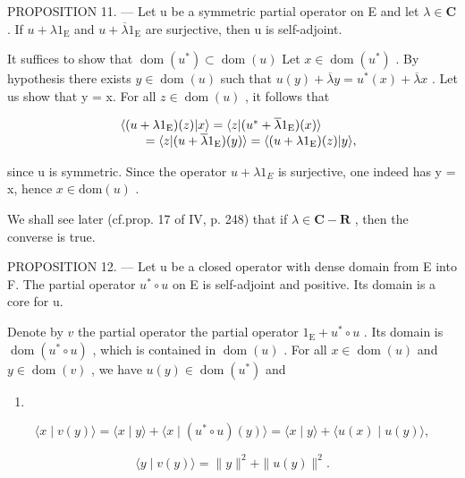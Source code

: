 PROPOSITION 11. --- Let u be a symmetric partial operator on E and let \(\lambda \in \mathbf{C}\) . If \(u + \lambda 1_{\mathrm{E}}\) and \(u + \overline{\lambda} 1_{\mathrm{E}}\) are surjective, then u is self-adjoint.

It suffices to show that \(\operatorname{dom}(u^{*}) \subset \operatorname{dom}(u)\) Let \(x \in \operatorname{dom}(u^{*})\) . By hypothesis there exists \(y \in \operatorname{dom}(u)\) such that \(u(y) + \overline{\lambda}y = u^{*}(x) + \overline{\lambda}x\) . Let us show that y = x. For all \(z \in \operatorname{dom}(u)\) , it follows that

\[
\begin{array}{r l} & {\langle (u + \lambda 1 _ {\mathrm{E}}) (z) | x \rangle = \langle z | (u ^ {*} + \overline {{\lambda}} 1 _ {\mathrm{E}}) (x) \rangle} \\ & {\qquad = \langle z | (u + \overline {{\lambda}} 1 _ {\mathrm{E}}) (y) \rangle = \langle (u + \lambda 1 _ {\mathrm{E}}) (z) | y \rangle ,} \end{array}
\]

since u is symmetric. Since the operator \(u + \lambda1_{E}\) is surjective, one indeed has y = x, hence \(x \in \text{dom}(u)\) .

We shall see later (cf.prop. 17 of IV, p. 248) that if \(\lambda \in \mathbf{C} - \mathbf{R}\) , then the converse is true.

PROPOSITION 12. --- Let u be a closed operator with dense domain from E into F. The partial operator \(u^{*}\circ u\) on E is self-adjoint and positive. Its domain is a core for u.

Denote by \(v\) the partial operator the partial operator \(1_{\mathrm{E}} + u^{*} \circ u\) . Its domain is \(\operatorname{dom}(u^{*} \circ u)\) , which is contained in \(\operatorname{dom}(u)\) . For all \(x \in \operatorname{dom}(u)\) and \(y \in \operatorname{dom}(v)\) , we have \(u(y) \in \operatorname{dom}(u^{*})\) and

\begin{enumerate}
\def\labelenumi{(\arabic{enumi})}
\setcounter{enumi}{2}
\tightlist
\item
\end{enumerate}

\[
\langle x \mid v (y) \rangle = \langle x \mid y \rangle + \langle x \mid (u ^ {*} \circ u) (y) \rangle = \langle x \mid y \rangle + \langle u (x) \mid u (y) \rangle ,\tag{4}
\]

\[
\langle y \mid v (y) \rangle = \| y \| ^ {2} + \| u (y) \| ^ {2}.
\]

